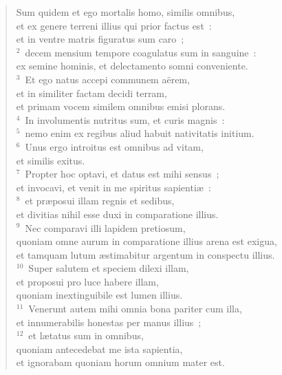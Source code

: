 \begin{flushleft}\begin{verse}\vspace{-19pt}Sum quidem et ego mortalis homo, similis omnibus,\\ et ex genere terreni illius qui prior factus est~:\\ et in ventre matris figuratus sum caro~;\\
${}^{2}$~decem mensium tempore coagulatus sum in sanguine~:\\ ex semine hominis, et delectamento somni conveniente.\\
${}^{3}$~Et ego natus accepi communem a\"erem,\\ et in similiter factam decidi terram,\\ et primam vocem similem omnibus emisi plorans.\\
${}^{4}$~In involumentis nutritus sum, et curis magnis~:\\
${}^{5}$~nemo enim ex regibus aliud habuit nativitatis initium.\\
${}^{6}$~Unus ergo introitus est omnibus ad vitam,\\ et similis exitus.\\
${}^{7}$~Propter hoc optavi, et datus est mihi sensus~;\\ et invocavi, et venit in me spiritus sapienti\ae~:\\
${}^{8}$~et pr\ae posui illam regnis et sedibus,\\ et divitias nihil esse duxi in comparatione illius.\\
${}^{9}$~Nec comparavi illi lapidem pretiosum,\\ quoniam omne aurum in comparatione illius arena est exigua,\\ et tamquam lutum \ae stimabitur argentum in conspectu illius.\\
${}^{10}$~Super salutem et speciem dilexi illam,\\ et proposui pro luce habere illam,\\ quoniam inextinguibile est lumen illius.\\
${}^{11}$~Venerunt autem mihi omnia bona pariter cum illa,\\ et innumerabilis honestas per manus illius~;\\
${}^{12}$~et l\ae tatus sum in omnibus,\\ quoniam antecedebat me ista sapientia,\\ et ignorabam quoniam horum omnium mater est.\\

\end{verse}
\end{flushleft}
